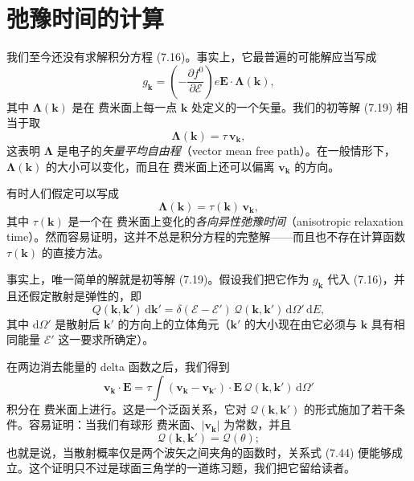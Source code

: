 \section{弛豫时间的计算}

我们至今还没有求解积分方程 (7.16)。事实上，它最普遍的可能解应当写成
\begin{equation*}
g_{\mathbf{k}}=\left(-\frac{\partial f^{0}}{\partial\mathcal{E}}\right)e\mathbf{E}\cdot\boldsymbol{\Lambda}(\mathbf{k}),\tag{7.40}
\end{equation*}
其中 $\boldsymbol{\Lambda}(\mathbf{k})$ 是在 费米面上每一点 $\mathbf{k}$ 处定义的一个矢量。我们的初等解 (7.19) 相当于取
\begin{equation*}
\boldsymbol{\Lambda}(\mathbf{k})=\tau\,\mathbf{v}_{\mathbf{k}},\tag{7.41}
\end{equation*}
这表明 $\boldsymbol{\Lambda}$ 是电子的\emph{矢量平均自由程}（vector mean free path）。在一般情形下，$\boldsymbol{\Lambda}(\mathbf{k})$ 的大小可以变化，而且在 费米面上还可以偏离 $\mathbf{v}_{\mathbf{k}}$ 的方向。

有时人们假定可以写成
\begin{equation*}
\boldsymbol{\Lambda}(\mathbf{k})=\tau(\mathbf{k})\,\mathbf{v}_{\mathbf{k}},\tag{7.42}
\end{equation*}
其中 $\tau(\mathbf{k})$ 是一个在 费米面上变化的\emph{各向异性弛豫时间}（anisotropic relaxation time）。然而容易证明，这并不总是积分方程的完整解——而且也不存在计算函数 $\tau(\mathbf{k})$ 的直接方法。

事实上，唯一简单的解就是初等解 (7.19)。假设我们把它作为 $g_{\mathbf{k}}$ 代入 (7.16)，并且还假定散射是弹性的，即
\begin{equation*}
Q(\mathbf{k},\mathbf{k}')\,\mathrm{d}\mathbf{k}'=\delta(\mathcal{E}-\mathcal{E}')\,\mathcal{Q}(\mathbf{k},\mathbf{k}')\,\mathrm{d}\Omega'\,\mathrm{d}E,\tag{7.43}
\end{equation*}
其中 $\mathrm{d}\Omega'$ 是散射后 $\mathbf{k}'$ 的方向上的立体角元（$\mathbf{k}'$ 的大小现在由它必须与 $\mathbf{k}$ 具有相同能量 $\mathcal{E}'$ 这一要求所确定）。

在两边消去能量的 delta 函数之后，我们得到
\begin{equation*}
\mathbf{v}_{\mathbf{k}}\cdot\mathbf{E}=\tau\int(\mathbf{v}_{\mathbf{k}}-\mathbf{v}_{\mathbf{k}'})\cdot\mathbf{E}\,\mathcal{Q}(\mathbf{k},\mathbf{k}')\,\mathrm{d}\Omega'\tag{7.44}
\end{equation*}
积分在 费米面上进行。这是一个泛函关系，它对 $\mathcal{Q}(\mathbf{k},\mathbf{k}')$ 的形式施加了若干条件。容易证明：当我们有球形 费米面、$|\mathbf{v}_{\mathbf{k}}|$ 为常数，并且
\begin{equation*}
\mathcal{Q}(\mathbf{k},\mathbf{k}')=\mathcal{Q}(\theta);\tag{7.45}
\end{equation*}
也就是说，当散射概率仅是两个波矢之间夹角的函数时，关系式 (7.44) 便能够成立。这个证明只不过是球面三角学的一道练习题，我们把它留给读者。

